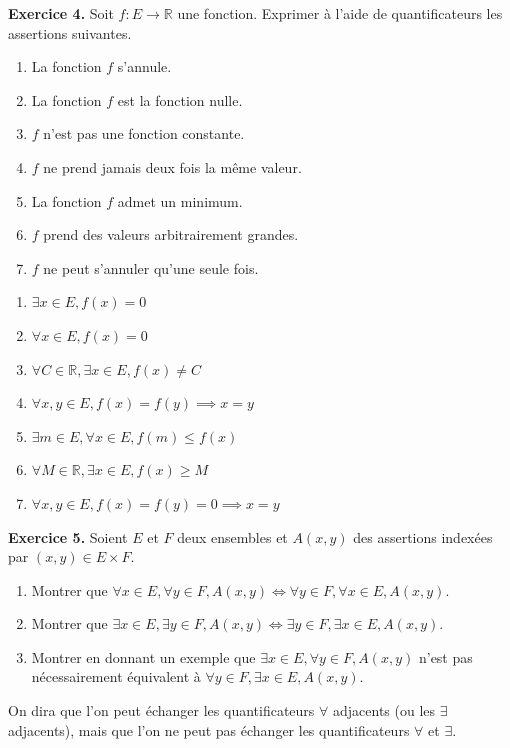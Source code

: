 \documentclass[a4paper, 10pt]{report}
\begin{document}
	\vspace{5mm}
	\noindent
	\textbf{Exercice 4.} Soit $f : E \to \mathbb{R}$ une fonction.
	Exprimer à l'aide de quantificateurs les assertions suivantes.
	
	\begin{enumerate}[label=(\roman*)]
		\item La fonction $f$ s'annule.
		\item La fonction $f$ est la fonction nulle.
		\item $f$ n'est pas une fonction constante.
		\item $f$ ne prend jamais deux fois la même valeur.
		\item La fonction $f$ admet un minimum.
		\item $f$ prend des valeurs arbitrairement grandes.
		\item $f$ ne peut s'annuler qu'une seule fois.
	\end{enumerate}
	
	\colorbox{solution}
	{
		\begin{minipage}{0.9\textwidth}
			\begin{enumerate}[label=(\roman*)]
				\item $\exists x \in E,
					f(x) = 0$
				\item $\forall x \in E,
					f(x) = 0$
				\item $\forall C \in \mathbb{R},
					\exists x \in E,
					f(x) \neq C$
				\item $\forall x, y \in E,
					f(x) = f(y) \implies x = y$
				\item $\exists m \in E,
					\forall x \in E,
					f(m) \leq f(x)$
				\item $\forall M \in \mathbb{R},
					\exists x \in E,
					f(x) \geq M$
				\item $\forall x, y \in E,
					f(x) = f(y) = 0 \implies x = y$
			\end{enumerate}
		\end{minipage}
	}
	
	\newpage
	
	\noindent
	\textbf{Exercice 5.} Soient $E$ et $F$ deux ensembles et
	$A(x, y)$ des assertions indexées par $(x, y) \in E \times F$.
	
	\begin{enumerate}[label=(\roman*)]
		\item Montrer que $\forall x \in E, \forall y \in F, A(x, y)
			\iff \forall y \in F, \forall x \in E, A(x, y)$.
		\item Montrer que $\exists x \in E, \exists y \in F, A(x, y)
			\iff \exists y \in F, \exists x \in E, A(x, y)$.
		\item Montrer en donnant un exemple que $\exists x \in E,
			\forall y \in F, A(x, y)$ n'est pas nécessairement
			équivalent à $\forall y \in F, \exists x \in E, A(x, y)$.
	\end{enumerate}
	On dira que l'on peut échanger les quantificateurs $\forall$
	adjacents (ou les $\exists$ adjacents), mais que l'on ne peut
	pas échanger les quantificateurs $\forall$ et $\exists$. 
	
\end{document}
